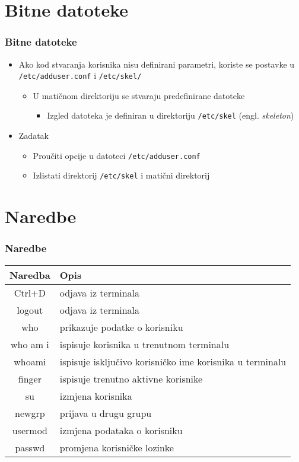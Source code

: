 \documentclass[table,usenames,dvipsnames] {beamer}
\newcommand{\shell}[1]{\texttt{#1}}
\begin{document}
\section{Bitne datoteke}
\begin{frame}[t]
\frametitle{Bitne datoteke}
\begin{itemize}
  \item Ako kod stvaranja korisnika nisu definirani parametri, koriste se 
        postavke u \shell{/etc/adduser.conf} i \shell{/etc/skel/}
  \begin{itemize}
    \item U matičnom direktoriju se stvaraju predefinirane datoteke
    \begin{itemize}
      \item Izgled datoteka je definiran u direktoriju \shell{/etc/skel}
               (engl. \emph{skeleton})
    \end{itemize}
  \end{itemize}
  \item Zadatak
  \begin{itemize}
    \item Proučiti opcije u datoteci \shell{/etc/adduser.conf}
    \item Izlistati direktorij \shell{/etc/skel} i matični direktorij
  \end{itemize}
\end{itemize}
\end{frame}

\section{Naredbe}
\begin{frame}[t]
	\frametitle{Naredbe}
	\begin{table}[h]
		\begin{tabular}{|c|l|}
			\hline
			\rowcolor{BlueViolet!20}Naredba & Opis \\
			\hline
			Ctrl+D & odjava iz terminala \\
			\hline
			logout & odjava iz terminala \\
			\hline
			who & prikazuje podatke o korisniku \\
			\hline
			who am i & ispisuje korisnika u trenutnom terminalu \\
			\hline
			whoami & ispisuje isključivo korisničko ime korisnika u terminalu \\
			\hline
			finger & ispisuje trenutno aktivne korisnike \\
			\hline
			su & izmjena korisnika \\
			\hline
			newgrp & prijava u drugu grupu \\
			\hline
			usermod & izmjena podataka o korisniku \\
			\hline
			passwd & promjena korisničke lozinke \\
			\hline
		\end{tabular}
	\end{table}
\end{frame}
\end{document}
